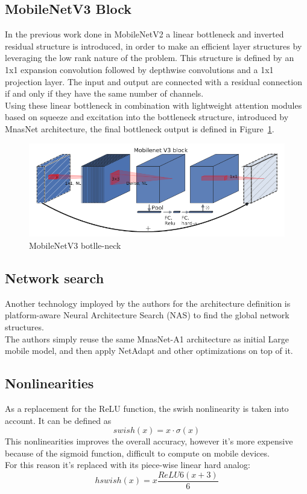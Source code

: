 \documentclass[12pt, letterpaper, twoside]{article}
\begin{document}
\subsection{MobileNetV3 Block}
In the previous work done in MobileNetV2 a linear bottleneck and inverted residual structure is introduced, in order to make an efficient layer structures by leveraging the low rank nature of the problem. This structure is defined by an 1x1 expansion convolution followed by depthwise convolutions and a 1x1 projection layer. The input and output are connected with a residual connection if and only if they have the same number of channels.\\
Using these linear bottleneck in combination with lightweight attention modules based on squeeze and excitation into the bottleneck structure, introduced by MnasNet architecture, the final bottleneck output is defined in Figure~\ref{fig:bottle_neck}.

\begin{figure}[H]
	\centering
	\includegraphics[width=1\textwidth]{bottle_neck.png}
	\caption{MobileNetV3 botlle-neck}
	\label{fig:bottle_neck}
\end{figure}

\subsection{Network search}
Another technology imployed by the authors for the architecture definition is platform-aware Neural Architecture Search (NAS) to find the global network structures.\\
The authors simply reuse the same MnasNet-A1 architecture as initial Large mobile model, and then apply NetAdapt and other optimizations on top of it.

\subsection{Nonlinearities}
As a replacement for the ReLU function, the swish nonlinearity is taken into account. It can be defined as 
$$swish(x) = x \cdot \sigma(x)$$
This nonlinearities improves the overall accuracy, however it's more expensive because of the sigmoid function, difficult to compute on mobile devices. \\
For this reason it's replaced with its piece-wise linear hard analog:
$$hswish(x) = x \frac{ReLU6(x+3)}{6}$$
\end{document}
